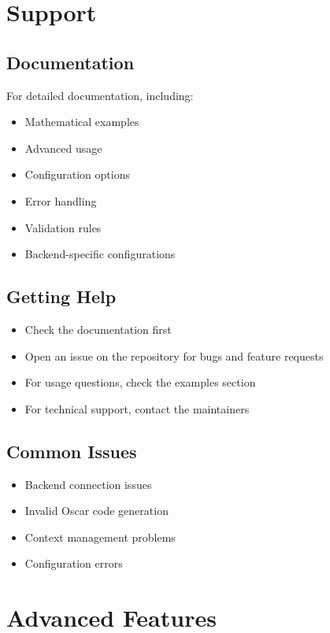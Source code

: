 \documentclass[11pt,a4paper]{article}
\begin{document}
\section{Support}
\label{sec:support}

\subsection{Documentation}
For detailed documentation, including:
\begin{itemize}
    \item Mathematical examples
    \item Advanced usage
    \item Configuration options
    \item Error handling
    \item Validation rules
    \item Backend-specific configurations
\end{itemize}

\subsection{Getting Help}
\begin{itemize}
    \item Check the documentation first
    \item Open an issue on the repository for bugs and feature requests
    \item For usage questions, check the examples section
    \item For technical support, contact the maintainers
\end{itemize}

\subsection{Common Issues}
\begin{itemize}
    \item Backend connection issues
    \item Invalid Oscar code generation
    \item Context management problems
    \item Configuration errors
\end{itemize}

\printindex

\section{Advanced Features}
\label{sec:advanced-features}
\end{document}
